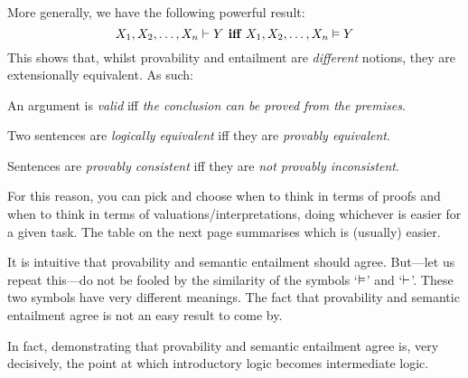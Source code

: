 More generally, we have the following powerful result:
$$X_1, X_2, \ldots, X_n \vdash Y \textbf{ iff }X_1, X_2, \ldots, X_n \vDash Y$$
This shows that, whilst provability and entailment are \emph{different} notions, they are extensionally equivalent. As such:
	\begin{ebullet}
		\item An argument is \emph{valid} iff \emph{the conclusion can be proved from the premises}.
		\item Two sentences are \emph{logically equivalent} iff they are \emph{provably equivalent}.
		\item Sentences are \emph{provably consistent} iff they are \emph{not provably inconsistent}.
	\end{ebullet}
For this reason, you can pick and choose when to think in terms of proofs and when to think in terms of valuations/interpretations, doing whichever is easier for a given task. The table on the next page summarises which is (usually) easier.

It is intuitive that provability and semantic entailment should agree. But---let us repeat this---do not be fooled by the similarity of the symbols `$\vDash$' and `$\vdash$'. These two symbols have very different meanings. The fact that provability and semantic entailment agree is not an easy result to come by.

In fact, demonstrating that provability and semantic entailment agree is, very decisively, the point at which introductory logic becomes intermediate logic.

